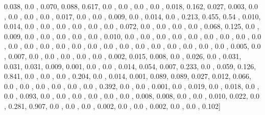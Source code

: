 \documentclass[usenames,dvipsnames]{article} %
\begin{document}
0.038, 0.0  , 0.070, 0.088, 0.617, 0.0  , 0.0  , 0.0  , 0.0  , 0.018, 0.162, 0.027, 0.003, 0.0  , 0.0  , 0.0  , 0.0  , 0.017, 0.0  , 0.0  , 0.009, 0.0  , 0.014, 0.0  , 0.213, 0.455, 0.54 , 0.010, 0.014, 0.0  , 0.0  , 0.0  , 0.0  , 0.0  , 0.0  , 0.072, 0.0  , 0.0  , 0.0  , 0.0  , 0.068, 0.125, 0.0  , 0.009, 0.0  , 0.0  , 0.0  , 0.0  , 0.0  , 0.010, 0.0  , 0.0  , 0.0  , 0.0  , 0.0  , 0.0  , 0.0  , 0.0  , 0.0  , 0.0  , 0.0  , 0.0  , 0.0  , 0.0  , 0.0  , 0.0  , 0.0  , 0.0  , 0.0  , 0.0  , 0.0  , 0.0  , 0.0  , 0.005, 0.0  , 0.007, 0.0  , 0.0  , 0.0  , 0.0  , 0.0  , 0.002, 0.015, 0.008, 0.0  , 0.026, 0.0  , 0.031, 0.031, 0.031, 0.009, 0.001, 0.0  , 0.0  , 0.014, 0.054, 0.007, 0.233, 0.0  , 0.059, 0.126, 0.841, 0.0  , 0.0  , 0.0  , 0.204, 0.0  , 0.014, 0.001, 0.089, 0.089, 0.027, 0.012, 0.066, 0.0  , 0.0  , 0.0  , 0.0  , 0.0  , 0.0  , 0.392, 0.0  , 0.0  , 0.001, 0.0  , 0.019, 0.0  , 0.018, 0.0  , 0.0  , 0.093, 0.0  , 0.0  , 0.0  , 0.0  , 0.0  , 0.0  , 0.008, 0.008, 0.0  , 0.0  , 0.010, 0.022, 0.0  , 0.281, 0.907, 0.0  , 0.0  , 0.0  , 0.002, 0.0  , 0.0  , 0.002, 0.0  , 0.0  , 0.102]
\end{document}
